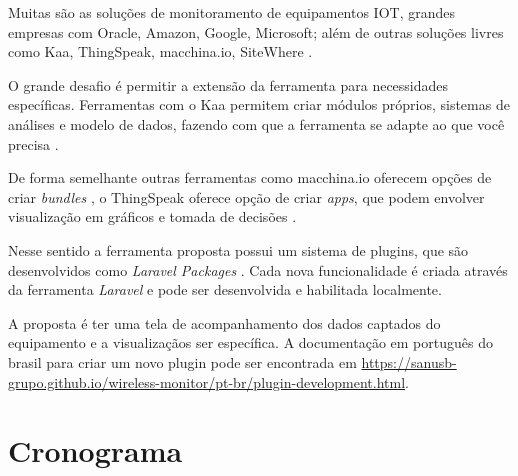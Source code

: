 Muitas são as soluções de monitoramento de equipamentos IOT, grandes
empresas com Oracle, Amazon, Google, Microsoft; além de outras soluções
livres como Kaa, ThingSpeak, macchina.io, SiteWhere
\cite{postscapes-iot-2016}.

O grande desafio é permitir a extensão da ferramenta para necessidades
específicas. Ferramentas com o Kaa permitem criar módulos próprios,
sistemas de análises e modelo de dados, fazendo com que a ferramenta se
adapte ao que você precisa \cite{kaa-2014}.

De forma semelhante outras ferramentas como macchina.io oferecem opções
de criar \emph{bundles} \cite{macchina.io-2016}, o ThingSpeak oferece
opção de criar \emph{apps}, que podem envolver visualização em gráficos
e tomada de decisões \cite{thingspeak-2016}.

Nesse sentido a ferramenta proposta possui um sistema de plugins, que
são desenvolvidos como \emph{Laravel Packages}
\cite{laravel-packages-2016}. Cada nova funcionalidade é criada através
da ferramenta \emph{Laravel} e pode ser desenvolvida e habilitada
localmente.

A proposta é ter uma tela de acompanhamento dos dados captados do
equipamento e a visualizaçãos ser específica. A documentação em
português do brasil para criar um novo plugin pode ser encontrada em
\url{https://sanusb-grupo.github.io/wireless-monitor/pt-br/plugin-development.html}.

\section{Cronograma}\label{cronograma}

